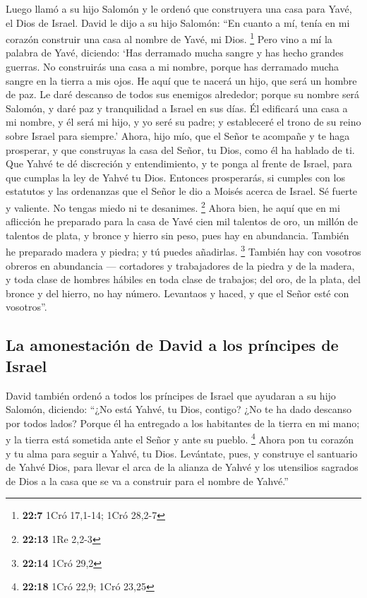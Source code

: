  Luego llamó a su hijo Salomón y le ordenó que construyera
una casa para Yavé, el Dios de Israel.  David le dijo a su
hijo Salomón: ``En cuanto a mí, tenía en mi corazón construir una casa
al nombre de Yavé, mi Dios. \footnote{\textbf{22:7} 1Cró 17,1-14; 1Cró
  28,2-7}  Pero vino a mí la palabra de Yavé, diciendo:
`Has derramado mucha sangre y has hecho grandes guerras. No construirás
una casa a mi nombre, porque has derramado mucha sangre en la tierra a
mis ojos.  He aquí que te nacerá un hijo, que será un
hombre de paz. Le daré descanso de todos sus enemigos alrededor; porque
su nombre será Salomón, y daré paz y tranquilidad a Israel en sus días.
 Él edificará una casa a mi nombre, y él será mi hijo, y
yo seré su padre; y estableceré el trono de su reino sobre Israel para
siempre.'  Ahora, hijo mío, que el Señor te acompañe y te
haga prosperar, y que construyas la casa del Señor, tu Dios, como él ha
hablado de ti.  Que Yahvé te dé discreción y
entendimiento, y te ponga al frente de Israel, para que cumplas la ley
de Yahvé tu Dios.  Entonces prosperarás, si cumples con
los estatutos y las ordenanzas que el Señor le dio a Moisés acerca de
Israel. Sé fuerte y valiente. No tengas miedo ni te desanimes.
\footnote{\textbf{22:13} 1Re 2,2-3}  Ahora bien, he aquí
que en mi aflicción he preparado para la casa de Yavé cien mil talentos
de oro, un millón de talentos de plata, y bronce y hierro sin peso, pues
hay en abundancia. También he preparado madera y piedra; y tú puedes
añadirlas. \footnote{\textbf{22:14} 1Cró 29,2}  También
hay con vosotros obreros en abundancia --- cortadores y trabajadores de
la piedra y de la madera, y toda clase de hombres hábiles en toda clase
de trabajos;  del oro, de la plata, del bronce y del
hierro, no hay número. Levantaos y haced, y que el Señor esté con
vosotros''.

\hypertarget{la-amonestaciuxf3n-de-david-a-los-pruxedncipes-de-israel}{%
\subsection{La amonestación de David a los príncipes de
Israel}\label{la-amonestaciuxf3n-de-david-a-los-pruxedncipes-de-israel}}

 David también ordenó a todos los príncipes de Israel que
ayudaran a su hijo Salomón, diciendo:  ``¿No está Yahvé,
tu Dios, contigo? ¿No te ha dado descanso por todos lados? Porque él ha
entregado a los habitantes de la tierra en mi mano; y la tierra está
sometida ante el Señor y ante su pueblo. \footnote{\textbf{22:18} 1Cró
  22,9; 1Cró 23,25}  Ahora pon tu corazón y tu alma para
seguir a Yahvé, tu Dios. Levántate, pues, y construye el santuario de
Yahvé Dios, para llevar el arca de la alianza de Yahvé y los utensilios
sagrados de Dios a la casa que se va a construir para el nombre de
Yahvé.''

